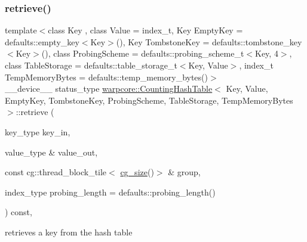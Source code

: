 \subsubsection{\texorpdfstring{retrieve()}{retrieve()}\hspace{0.1cm}{\footnotesize\ttfamily [1/2]}}
{\footnotesize\ttfamily template$<$class Key , class Value  = index\+\_\+t, Key Empty\+Key = defaults\+::empty\+\_\+key$<$\+Key$>$(), Key Tombstone\+Key = defaults\+::tombstone\+\_\+key$<$\+Key$>$(), class Probing\+Scheme  = defaults\+::probing\+\_\+scheme\+\_\+t$<$\+Key, 4$>$, class Table\+Storage  = defaults\+::table\+\_\+storage\+\_\+t$<$\+Key, Value$>$, index\+\_\+t Temp\+Memory\+Bytes = defaults\+::temp\+\_\+memory\+\_\+bytes()$>$ \\
\+\_\+\+\_\+device\+\_\+\+\_\+ status\+\_\+type \hyperlink{classwarpcore_1_1CountingHashTable}{warpcore\+::\+Counting\+Hash\+Table}$<$ Key, Value, Empty\+Key, Tombstone\+Key, Probing\+Scheme, Table\+Storage, Temp\+Memory\+Bytes $>$\+::retrieve (\begin{DoxyParamCaption}\item[{key\+\_\+type}]{key\+\_\+in,  }\item[{value\+\_\+type \&}]{value\+\_\+out,  }\item[{const cg\+::thread\+\_\+block\+\_\+tile$<$ \hyperlink{classwarpcore_1_1CountingHashTable_aeaf1b333eb176da987dee4d003e5dddc}{cg\+\_\+size}()$>$ \&}]{group,  }\item[{index\+\_\+type}]{probing\+\_\+length = {\ttfamily defaults\+:\+:probing\+\_\+length()} }\end{DoxyParamCaption}) const\hspace{0.3cm}{\ttfamily [inline]}, {\ttfamily [noexcept]}}



retrieves a key from the hash table 


